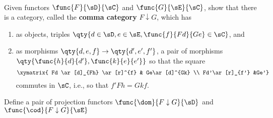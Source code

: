 \documentclass[../../main]{subfiles}
\begin{document}
\paragraph{}
\begin{exercise}
	Given functors $\func{F}{\sD}{\sC}$ and $\func{G}{\sE}{\sC}$, show that
	there is a category, called the {\bf comma category} $F\downarrow G$, which
	has
	\begin{enumerate}
		\item as objects, triples $\qty{d \in \sD,e \in \sE, \func{f}{Fd}{Ge}
			\in \sC}$, and

		\item as morphisms $\qty{d,e,f}\rightarrow \qty{d',e',f'}$, a pair of
			morphisms $\qty{\func{h}{d}{d'},\func{k}{e}{e'}}$ so that the square
			\[\xymatrix{
					Fd \ar[d]_{Fh} \ar[r]^{f} & Ge\ar[d]^{Gk}  \\
			Fd'\ar[r]_{f'} &Ge'}\]
			commutes in $\sC$, i.e., so that $f' Fh = Gk  f$.
	\end{enumerate}
	Define a pair of projection functors $\func{\dom}{F\downarrow G}{\sD}$ and
	$\func{\cod}{F\downarrow G}{\sE}$
\end{exercise}
\end{document}
